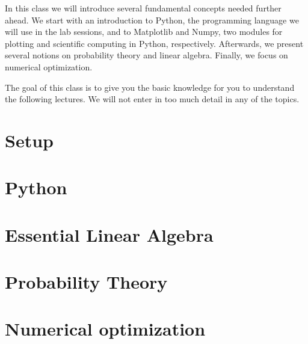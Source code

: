 
In this class we will introduce several fundamental concepts needed further ahead. We start with an introduction to Python, the programming language we will use in the lab sessions, and to Matplotlib and Numpy, two modules for plotting and scientific computing in Python, respectively. Afterwards, we present several notions on probability theory and linear algebra. Finally, we focus on numerical optimization. 

The goal of this class is to give you the basic knowledge for you to understand the following lectures. We will not enter in too much detail in any of the topics. 

\section{Setup}


\section{Python}
\label{sec:Python}


\section{Essential Linear Algebra}


\section{Probability Theory}


\section{Numerical optimization\label{numerical_optimization}}







